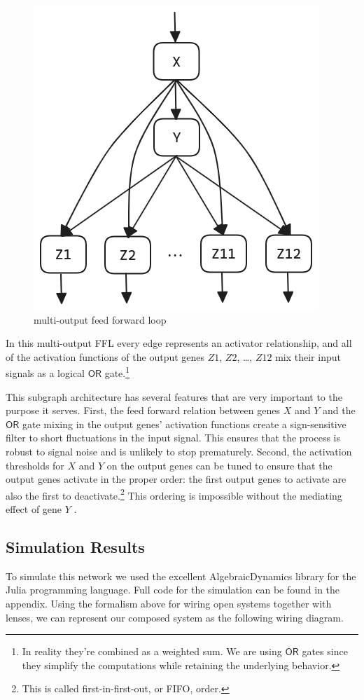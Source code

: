\documentclass[12pt]{article}
\begin{document}
\begin{figure}[h]
    \centering
    \includegraphics*[scale=0.35]{multioutput_FFL.png}
    \caption{multi-output feed forward loop}
    \label{fig:FFL}
\end{figure}

In this multi-output FFL every edge represents an activator relationship, and all of the activation functions of the output genes $Z1$, $Z2$, \dots, $Z12$ mix their input signals as a logical $\mathsf{OR}$ gate.\footnote{In reality they're combined as a weighted sum. We are using $\mathsf{OR}$ gates since they simplify the computations while retaining the underlying behavior.}

This subgraph architecture has several features that are very important to the purpose it serves.
First, the feed forward relation between genes $X$ and $Y$ and the $\mathsf{OR}$ gate mixing in the output genes' activation functions create a sign-sensitive filter to short fluctuations in the input signal.
This ensures that the process is robust to signal noise and is unlikely to stop prematurely.
Second, the activation thresholds for $X$ and $Y$ on the output genes can be tuned to ensure that the output genes activate in the proper order: the first output genes to activate are also the first to deactivate.\footnote{This is called first-in-first-out, or FIFO, order.}
This ordering is impossible without the mediating effect of gene $Y$ \cite{alon2019introduction}.


\subsection*{Simulation Results}
To simulate this network we used the excellent AlgebraicDynamics library for the Julia programming language.
Full code for the simulation can be found in the appendix.
Using the formalism above for wiring open systems together with lenses, we can represent our composed system as the following wiring diagram.
\end{document}
